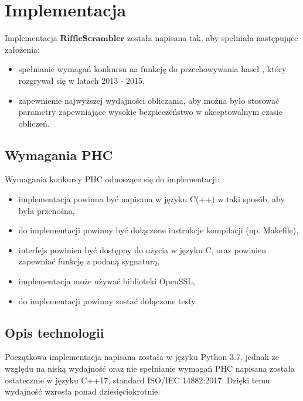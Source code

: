 \chapter{Implementacja}
\thispagestyle{chapterBeginStyle}

Implementacja $\mathbf{RiffleScrambler}$ została napisana tak, aby spełniała następujące założenia:
\begin{itemize}
	\item spełnianie wymagań konkursu na funkcję do przechowywania haseł \cite[PHC, ang \textit{Password Hashing Competition}]{PHC2013}, który rozgrywał się w latach 2013 - 2015,
	
	\item zapewnienie najwyższej wydajności obliczania, aby można było stosować parametry zapewniające wysokie bezpieczeństwo w akceptowalnym czasie obliczeń.
\end{itemize}

\section{Wymagania PHC}
Wymagania konkursy PHC odnoszące się do implementacji:
\begin{itemize}
	\item implementacja powinna być napisana w języku C(++) w taki sposób, aby była przenośna,
	\item do implementacji powinny być dołączone instrukcje kompilacji (np. Makefile),
	\item interfejs powinien być dostępny do użycia w języku C, oraz powinien zapewniać funkcję z podaną sygnaturą,
	\item implementacja może używać biblioteki OpenSSL,
	\item do implementacji powinny zostać dołączone testy.
\end{itemize}




\section{Opis technologii}
Początkowa implementacja napisana została w języku Python 3.7, jednak ze względu na niską wydajność oraz nie spełnianie wymagań PHC napisana została ostatecznie w języku C++17, standard ISO/IEC 14882:2017.
Dzięki temu wydajność wzrosła ponad dziesięciokrotnie.

